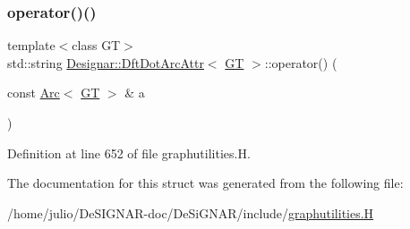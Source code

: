 \subsubsection{\texorpdfstring{operator()()}{operator()()}}
{\footnotesize\ttfamily template$<$class GT$>$ \\
std\+::string \hyperlink{struct_designar_1_1_dft_dot_arc_attr}{Designar\+::\+Dft\+Dot\+Arc\+Attr}$<$ \hyperlink{demo-buildgraph_8_c_a3001c40d2c31ca87ed96cd7d1334a55e}{GT} $>$\+::operator() (\begin{DoxyParamCaption}\item[{const \hyperlink{namespace_designar_a3f55fb5513d62ff47cbc8f72b8e95d6f}{Arc}$<$ \hyperlink{demo-buildgraph_8_c_a3001c40d2c31ca87ed96cd7d1334a55e}{GT} $>$ \&}]{a }\end{DoxyParamCaption})\hspace{0.3cm}{\ttfamily [inline]}}



Definition at line 652 of file graphutilities.\+H.



The documentation for this struct was generated from the following file\+:\begin{DoxyCompactItemize}
\item 
/home/julio/\+De\+S\+I\+G\+N\+A\+R-\/doc/\+De\+Si\+G\+N\+A\+R/include/\hyperlink{graphutilities_8_h}{graphutilities.\+H}\end{DoxyCompactItemize}
